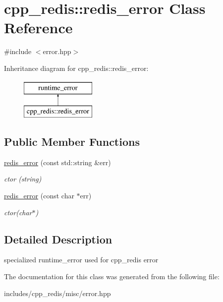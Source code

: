 \hypertarget{classcpp__redis_1_1redis__error}{}\section{cpp\+\_\+redis\+:\+:redis\+\_\+error Class Reference}
\label{classcpp__redis_1_1redis__error}


{\ttfamily \#include $<$error.\+hpp$>$}

Inheritance diagram for cpp\+\_\+redis\+:\+:redis\+\_\+error\+:\begin{figure}[H]
\begin{center}
\leavevmode
\includegraphics[height=2.000000cm]{classcpp__redis_1_1redis__error}
\end{center}
\end{figure}
\subsection*{Public Member Functions}
\begin{DoxyCompactItemize}
\item 
\mbox{\label{classcpp__redis_1_1redis__error_a1445e654b3936c7f5aa1c298bcf24966}} 
\mbox{\hyperlink{classcpp__redis_1_1redis__error_a1445e654b3936c7f5aa1c298bcf24966}{redis\+\_\+error}} (const std\+::string \&err)
\begin{DoxyCompactList}\small\item\em ctor (string) \end{DoxyCompactList}\item 
\mbox{\label{classcpp__redis_1_1redis__error_a0ced25483119c2318b1a5a69cac1919f}} 
\mbox{\hyperlink{classcpp__redis_1_1redis__error_a0ced25483119c2318b1a5a69cac1919f}{redis\+\_\+error}} (const char $\ast$err)
\begin{DoxyCompactList}\small\item\em ctor(char$\ast$) \end{DoxyCompactList}\end{DoxyCompactItemize}


\subsection{Detailed Description}
specialized runtime\+\_\+error used for cpp\+\_\+redis error 

The documentation for this class was generated from the following file\+:\begin{DoxyCompactItemize}
\item 
includes/cpp\+\_\+redis/misc/error.\+hpp\end{DoxyCompactItemize}
